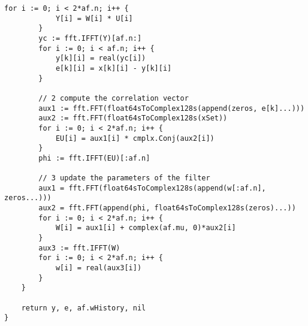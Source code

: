 \begin{lstlisting}[caption=fblms.go,label=fblms.go]
		for i := 0; i < 2*af.n; i++ {
			Y[i] = W[i] * U[i]
		}
		yc := fft.IFFT(Y)[af.n:]
		for i := 0; i < af.n; i++ {
			y[k][i] = real(yc[i])
			e[k][i] = x[k][i] - y[k][i]
		}

		// 2 compute the correlation vector
		aux1 := fft.FFT(float64sToComplex128s(append(zeros, e[k]...)))
		aux2 := fft.FFT(float64sToComplex128s(xSet))
		for i := 0; i < 2*af.n; i++ {
			EU[i] = aux1[i] * cmplx.Conj(aux2[i])
		}
		phi := fft.IFFT(EU)[:af.n]

		// 3 update the parameters of the filter
		aux1 = fft.FFT(float64sToComplex128s(append(w[:af.n], zeros...)))
		aux2 = fft.FFT(append(phi, float64sToComplex128s(zeros)...))
		for i := 0; i < 2*af.n; i++ {
			W[i] = aux1[i] + complex(af.mu, 0)*aux2[i]
		}
		aux3 := fft.IFFT(W)
		for i := 0; i < 2*af.n; i++ {
			w[i] = real(aux3[i])
		}
	}

	return y, e, af.wHistory, nil
}
\end{lstlisting}

